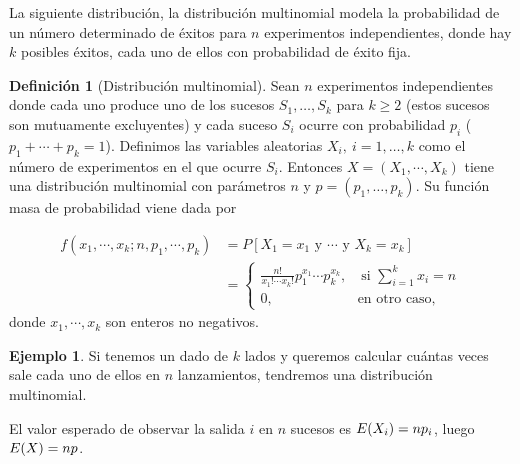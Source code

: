 \documentclass[10pt,a4paper]{article} %
\let\mathbb\relax
\theoremstyle{definition}
\newtheorem{definition}{Definición}[section]
\newtheorem{example}[theorem]{Ejemplo}
\begin{document}
La siguiente distribución, la distribución multinomial modela la probabilidad de un número determinado de éxitos para $n$ experimentos independientes, donde hay $k$ posibles éxitos, cada uno de ellos con probabilidad de éxito fija.

\begin{definition}[Distribución multinomial]
 Sean $n$ experimentos independientes donde cada uno produce uno de los sucesos $S_1,\dots,S_k$ para $k\geq 2$ (estos sucesos son mutuamente excluyentes) y cada suceso $S_i$ ocurre con probabilidad $p_i$ ($p_1+\cdots+p_k = 1$). Definimos las variables aleatorias $X_i,\ i=1,\dots,k$ como el número de experimentos en el que ocurre $S_i$. Entonces $X=(X_1,\cdots,X_k)$ tiene una distribución multinomial con parámetros $n$ y $p = (p_1,\dots, p_k)$. Su función masa de probabilidad viene dada por

\begin{align*}
f(x_1,\cdots,x_k; n, p_1,\cdots,p_k) &= P[X_1 = x_1\text{ y } \cdots \text{ y } X_k = x_k]\\ &=
\begin{cases}
    \frac{n!}{x_1!\cdots x_k!} p_1^{x_1} \cdots  p_k^{x_k},\quad\text{si } \sum_{i=1}^kx_i = n\\
    0, \qquad \qquad \qquad\text{en otro caso,}
\end{cases}
\end{align*}
donde $x_1,\cdots, x_k$ son enteros no negativos.
\end{definition}


\begin{example}
  Si tenemos un dado de $k$ lados y queremos calcular cuántas veces sale cada uno de ellos en $n$ lanzamientos, tendremos una distribución multinomial.\\
\end{example}

El valor esperado de observar la salida $i$ en $n$ sucesos es $\mathbb{E}(X_i) = np_i$, luego $\mathbb{E}(X) = np$.
\end{document}
